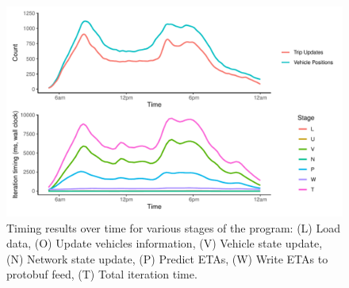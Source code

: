 \begin{knitrout}
\color{fgcolor}\begin{figure}
\includegraphics[width=\textwidth]{figure/prediction_timing_time-1} \caption[Timing results over time for various stages of the program]{Timing results over time for various stages of the program: (L) Load data, (O) Update vehicles information, (V) Vehicle state update, (N) Network state update, (P) Predict ETAs, (W) Write ETAs to protobuf feed, (T) Total iteration time.}\label{fig:prediction_timing_time}
\end{figure}


\end{knitrout}
